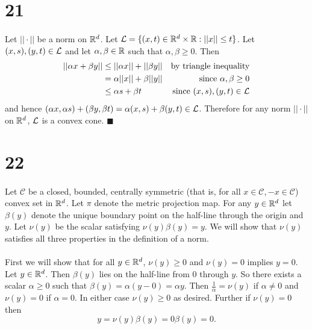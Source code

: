 \documentclass[letterpaper,12pt,oneside,onecolumn]{article}
\newcommand{\cC}{\mathcal{C}} \newcommand{\cD}{\mathcal{D}}
\begin{document}
\section*{21}
\paragraph{}
Let $||\cdot||$ be a norm on $\mathbb{R}^d$. Let $\mathcal{L} = \{(x,t) \in \mathbb{R}^d \times \mathbb{R}: ||x|| \leq t\}$. Let $(x,s), (y,t) \in \mathcal{L}$ and let $\alpha, \beta \in \mathbb{R}$ such that $\alpha, \beta \geq 0$. Then 
\begin{align*}
||\alpha x +\beta y|| &\leq ||\alpha x|| + ||\beta y|| &\text{by triangle inequality} \\
&= \alpha ||x|| + \beta ||y|| &\text{since $\alpha, \beta \geq 0$} \\
&\leq \alpha s + \beta t &\text{since $(x,s), (y,t) \in \mathcal{L}$}
\end{align*}
and hence $(\alpha x, \alpha s) + (\beta y, \beta t)  = \alpha(x,s) + \beta(y,t)\in \mathcal{L}$. Therefore for any norm $||\cdot ||$ on $\mathbb{R}^d$, $\mathcal{L}$ is a convex cone. $\blacksquare$
\section*{22}
\paragraph{}
Let $\cC$ be a closed, bounded, centrally symmetric (that is, for all $x \in \cC, -x\in \cC$) convex set in $\mathbb{R}^d$. Let $\pi$ denote the metric projection map. For any $y \in \mathbb{R}^d$ let $\beta(y)$ denote the unique boundary point on the half-line through the origin and $y$. Let $\nu(y)$ be the scalar satisfying $\nu(y)\beta(y) = y$. We will show that $\nu(y)$ satisfies all three properties in the definition of a norm.
\paragraph{}
First we will show that for all $y \in \mathbb{R}^d$, $\nu(y) \geq 0$ and $\nu(y) = 0$ implies $y = 0$. Let $y \in \mathbb{R}^d$. Then $\beta(y)$ lies on the half-line from $0$ through $y$. So there exists a scalar $\alpha \geq 0$ such that $\beta(y) = \alpha (y-0) = \alpha y$. Then $\frac{1}{\alpha} = \nu(y)$ if $\alpha \neq 0$ and $\nu(y) = 0$ if $\alpha = 0$. In either case $\nu(y) \geq 0$ as desired. Further if $\nu(y) = 0$ then
$$ y = \nu(y) \beta(y) = 0 \beta(y) = 0.$$
\end{document}
